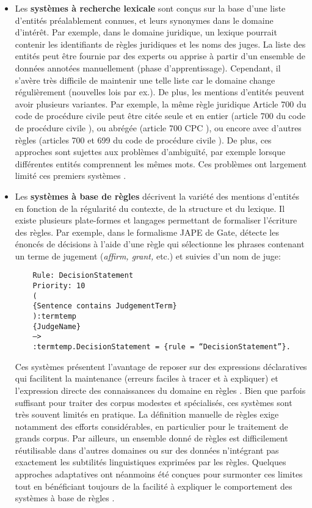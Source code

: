 \begin{itemize}
\item Les \textbf{systèmes à recherche lexicale} sont conçus sur la base d'une liste d'entités préalablement connues, et leurs synonymes dans le domaine d'intérêt. Par exemple, dans le domaine juridique, un lexique pourrait contenir les identifiants de règles juridiques et les noms des juges. La liste des entités peut être fournie par des experts ou apprise à partir d'un ensemble de données annotées manuellement (phase d'apprentissage). Cependant, il s'avère très difficile de maintenir une telle liste car le domaine change régulièrement (nouvelles lois par ex.). De plus, les mentions d'entités peuvent avoir plusieurs variantes. Par exemple, la même règle juridique \og Article 700 du code de procédure civile \fg{} peut être citée seule et en entier (\og article 700 du code de procédure civile \fg{}), ou abrégée (\og article 700 CPC \fg{}), ou encore avec d'autres règles (\og articles 700 et 699 du code de procédure civile \fg{}). De plus, ces approches sont sujettes aux problèmes d'ambiguïté, par exemple lorsque différentes entités comprennent les mêmes mots. Ces problèmes ont largement limité ces premiers systèmes \citep{palmer1997learnedLookup}.

\item Les \textbf{systèmes à base de règles} décrivent la variété des mentions d'entités en fonction de la régularité du contexte, de la structure et du lexique. Il existe plusieurs plate-formes et langages permettant de formaliser l'écriture des règles. Par exemple, dans le formalisme JAPE de Gate, \citet{wyner2010extractlegalelts} détecte les énoncés de décisions à l'aide d'une règle qui sélectionne les phrases contenant un terme de jugement (\textit{affirm, grant,} etc.) et suivies d'un nom de juge:

\begin{verbatim}
	Rule: DecisionStatement
	Priority: 10
	(
	{Sentence contains JudgementTerm}
	):termtemp
	{JudgeName}
	–>
	:termtemp.DecisionStatement = {rule = “DecisionStatement”}.
\end{verbatim}

 Ces systèmes présentent l'avantage de reposer sur des expressions déclaratives qui facilitent la maintenance (erreurs faciles à tracer et à expliquer) et l'expression directe des connaissances du domaine en règles \citep{waltl2018ruleiesurvey}. Bien que parfois suffisant pour traiter des corpus modestes et spécialisés, ces systèmes sont très souvent limités en pratique. La définition manuelle de règles exige notamment des efforts considérables, en particulier pour le traitement de grands corpus. Par ailleurs, un ensemble donné de règles est difficilement réutilisable dans d'autres domaines ou sur des données n'intégrant pas exactement les subtilités linguistiques exprimées par les règles. Quelques approches adaptatives ont néanmoins été conçues pour surmonter ces limites tout en bénéficiant toujours de la facilité à expliquer le comportement des systèmes à base de règles \citep{siniakov2008gropusrulebased,chiticariu2010adaptativerulebased}.


\end{itemize}
